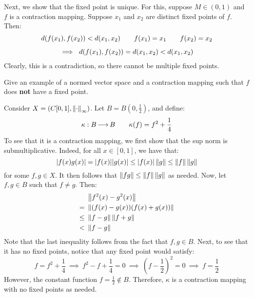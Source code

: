 \begin{soln}[title=Uniqueness]
    Next, we show that the fixed point is unique.
    For this, suppose $ M \in (0, 1) $ and $ f $ is a contraction mapping. \vsp
    Suppose $ x_{1} $ and $ x_{2} $ are distinct fixed points of $ f $. Then:
    \begin{gather*}
        d(f(x_{1}), f(x_{2})) < d(x_{1}, x_{2}) \qquad
        f(x_{1}) = x_{1} \qquad
        f(x_{2}) = x_{2} \vsp
        \implies \ d(f(x_{1}), f(x_{2})) = d(x_{1}, x_{2}) < d(x_{1}, x_{2})
    \end{gather*}
    Clearly, this is a contradiction, so there cannot be multiple fixed points.
\end{soln}

\begin{qu}[num=11.2]
    Give an example of a normed vector space and a contraction mapping such that
    $ f $ does \textbf{not} have a fixed point.
\end{qu}

\begin{soln}
    Consider $ X = (C[0,1], \left\|\cdot\right\|_{\infty}) $.
    Let $ B = B \left( 0, \frac{1}{2} \right) $, and define:
    \begin{equation*}
        \kappa: B \operatorname{\longrightarrow} B \qquad \kappa(f) = f^{2} + \frac{1}{4}
    \end{equation*}
    To see that it is a contraction mapping, we first show that the sup norm is
    submultiplicative. Indeed, for all $ x \in [0,1] $, we have that:
    \begin{equation*}
        \abs{f(x)g(x)} = \abs{f(x)}\abs{g(x)} \leq \abs{f(x)}\left\|g\right\| \leq
        \left\|f\right\|\left\|g\right\|
    \end{equation*}
    for some $ f, g \in X $.
    It then follows that $ \left\|fg\right\| \leq \left\|f\right\|\left\|g\right\| $ as needed.
    Now, let $ f, g \in B $ such that $ f \neq g $. Then:
    \begin{align*}
        &  \left\|f^{2}(x) - g^{2}(x)\right\| \\
        = \ & \left\|(f(x) - g(x))(f(x) + g(x))\right\| \\
        \leq \ & \left\|f - g\right\| \left\|f + g\right\| \\
        < \ & \left\|f - g\right\|
    \end{align*}
    Note that the last inequality follows from the fact that $ f, g \in B $.
    Next, to see that it has no fixed points, notice that any fixed point would
    satisfy:
    \begin{equation*}
        f = f^{2} + \frac{1}{4}
        \ \implies \ f^{2} - f + \frac{1}{4} = 0
        \ \implies \ \left( f - \frac{1}{2} \right)^{2} = 0
        \ \implies \ f = \frac{1}{2}
    \end{equation*}
    However, the constant function $ f = \frac{1}{2} \notin B $.
    Therefore, $ \kappa $ is a contraction mapping with no fixed points
    as needed.
\end{soln}

